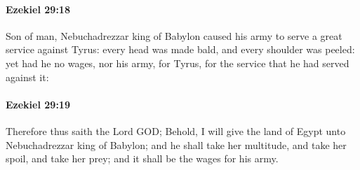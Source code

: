 		\paragraph{Ezekiel 29:18} %
			\label{EZEKIEL-29-18}

			Son of man, Nebuchadrezzar king of Babylon caused his army to serve a great service against Tyrus: every head was made bald, and every shoulder was peeled: yet had he no wages, nor his army, for Tyrus, for the service that he had served against it:


		\paragraph{Ezekiel 29:19} %
			\label{EZEKIEL-29-19}

			Therefore thus saith the Lord GOD; Behold, I will give the land of Egypt unto Nebuchadrezzar king of Babylon; and he shall take her multitude, and take her spoil, and take her prey; and it shall be the wages for his army.


